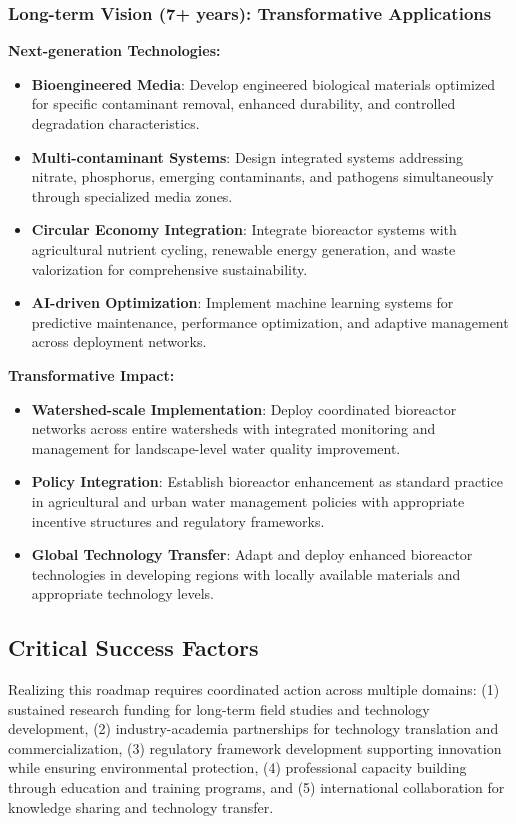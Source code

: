 \documentclass[12pt,a4paper]{article}
\begin{document}
\subsubsection{Long-term Vision (7+ years): Transformative Applications}

\textbf{Next-generation Technologies:}
\begin{itemize}
\item \textbf{Bioengineered Media}: Develop engineered biological materials optimized for specific contaminant removal, enhanced durability, and controlled degradation characteristics.
\item \textbf{Multi-contaminant Systems}: Design integrated systems addressing nitrate, phosphorus, emerging contaminants, and pathogens simultaneously through specialized media zones.
\item \textbf{Circular Economy Integration}: Integrate bioreactor systems with agricultural nutrient cycling, renewable energy generation, and waste valorization for comprehensive sustainability.
\item \textbf{AI-driven Optimization}: Implement machine learning systems for predictive maintenance, performance optimization, and adaptive management across deployment networks.
\end{itemize}

\textbf{Transformative Impact:}
\begin{itemize}
\item \textbf{Watershed-scale Implementation}: Deploy coordinated bioreactor networks across entire watersheds with integrated monitoring and management for landscape-level water quality improvement.
\item \textbf{Policy Integration}: Establish bioreactor enhancement as standard practice in agricultural and urban water management policies with appropriate incentive structures and regulatory frameworks.
\item \textbf{Global Technology Transfer}: Adapt and deploy enhanced bioreactor technologies in developing regions with locally available materials and appropriate technology levels.
\end{itemize}

\subsection{Critical Success Factors}

Realizing this roadmap requires coordinated action across multiple domains: (1) sustained research funding for long-term field studies and technology development, (2) industry-academia partnerships for technology translation and commercialization, (3) regulatory framework development supporting innovation while ensuring environmental protection, (4) professional capacity building through education and training programs, and (5) international collaboration for knowledge sharing and technology transfer.
\end{document}
